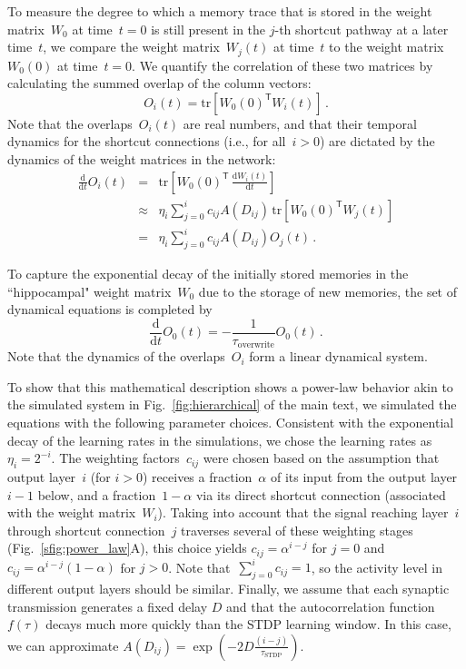 To measure the degree to which a memory trace that is stored in the weight matrix~$W_0$ at time~$t=0$ is still present in the $j$-th shortcut pathway at a later time~$t$, we compare the weight matrix~$W_j(t)$ at time~$t$ to the weight matrix~$W_0(0)$ at time~$t=0$. We quantify the correlation of these two matrices by calculating the summed overlap of the column vectors:
\begin{equation}
O_i(t) =  \mathrm{tr} \left[ W_0(0)^\mathsf{T} W_i(t) \right] \, .
\label{eq:overlap}
\end{equation}
Note that the overlaps~$O_i(t)$ are real numbers, and that their temporal dynamics for the shortcut connections (i.e., for all~$i>0$) are dictated by the dynamics of the weight matrices in the network:
\begin{eqnarray}
\frac{\mathrm{d}}{\mathrm{d}t} O_i(t)
& = &
\mathrm{tr} \left[  W_0(0)^\mathsf{T}\, \frac{\mathrm{d}W_i(t)}{\mathrm{d}t}\right]
\\
& \approx &
\eta_i \sum_{j=0}^i c_{ij} A(D_{ij}) \, \mathrm{tr} \left[  W_0(0)^\mathsf{T} W_j(t) \right]
\\& = &
\eta_i \sum_{j=0}^i c_{ij} A(D_{ij})  O_j(t) \,.
\end{eqnarray}

To capture the exponential decay of the initially stored memories in the ``hippocampal" weight matrix~$W_0$ due to the storage of new memories, the set of dynamical equations is completed by
\begin{equation}
\frac{\mathrm{d}}{\mathrm{d}t} O_0(t) = - \frac{1}{\tau_{\textrm{overwrite}}} O_0(t) \,.
\end{equation}
Note that the dynamics of the overlaps~$O_i$ form a linear dynamical system.

To show that this mathematical description shows a power-law behavior akin to the simulated system in Fig.~\ref{fig:hierarchical} of the main text, we simulated the equations with the following parameter choices. Consistent with the exponential decay of the learning rates in the simulations, we chose the learning rates as $\eta_i = 2^{-i}$. The weighting factors~$c_{ij}$ were chosen based on the assumption that output layer~$i$ (for $i>0$) receives a fraction~$\alpha$ of its input from the output layer~$i-1$ below, and a fraction~$1-\alpha$ via its direct shortcut connection (associated with the weight matrix~$W_i$). Taking into account that the signal reaching layer~$i$ through shortcut connection~$j$ traverses several of these weighting stages (Fig.~\ref{sfig:power_law}A), this choice yields
$c_{ij}=\alpha^{i-j}$ for $j=0$ and
$c_{ij}=\alpha^{i-j} (1-\alpha)$ for $j>0$.
Note that~$\sum_{j=0}^i c_{ij} = 1$, so the activity level in different output layers should be similar. Finally, we assume that each synaptic transmission generates a fixed delay $D$ and that the autocorrelation function~$f(\tau)$ decays much more quickly than the STDP learning window. In this case, we can approximate $A(D_{ij}) = \exp\left( - 2 D \frac{(i-j)}{\tau_\textrm{STDP}}\right)$.

